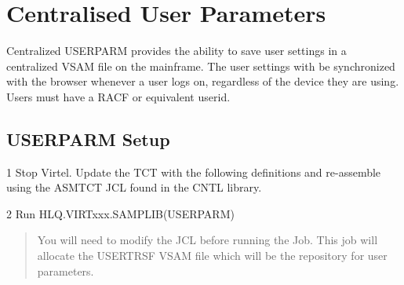 \documentclass[letterpaper,10pt,english]{sphinxmanual}
\begin{document}
\chapter{Centralised User Parameters}
\label{\detokenize{Customization:centralised-user-parameters}}\label{\detokenize{Customization:index-99}}
Centralized USERPARM provides the ability to save user settings in a centralized VSAM file on the mainframe. The user settings with be synchronized with the browser whenever a user logs on, regardless of the device they are using. Users must have a RACF or equivalent userid.


\section{USERPARM Setup}
\label{\detokenize{Customization:userparm-setup}}
1   Stop Virtel. Update the TCT with the following definitions and re-assemble using the ASMTCT JCL found in the CNTL library.
\begin{quote}

\begin{sphinxVerbatim}[commandchars=\\\{\}]
                                              
                                
            
\end{sphinxVerbatim}
\end{quote}

2   Run HLQ.VIRTxxx.SAMPLIB(USERPARM)
\begin{quote}

You will need to modify the JCL before running the Job. This job will allocate the USERTRSF VSAM file which will be the repository for user parameters.
\end{quote}
\end{document}

